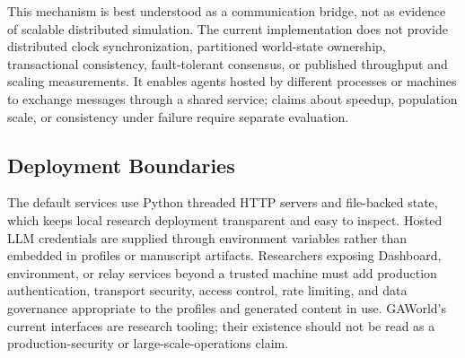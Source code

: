 This mechanism is best understood as a communication bridge, not as evidence
of scalable distributed simulation.  The current implementation does not
provide distributed clock synchronization, partitioned world-state ownership,
transactional consistency, fault-tolerant consensus, or published throughput
and scaling measurements.  It enables agents hosted by different processes or
machines to exchange messages through a shared service; claims about speedup,
population scale, or consistency under failure require separate evaluation.

\subsection{Deployment Boundaries}

The default services use Python threaded HTTP servers and file-backed state,
which keeps local research deployment transparent and easy to inspect.  Hosted
LLM credentials are supplied through environment variables rather than embedded
in profiles or manuscript artifacts.  Researchers exposing Dashboard,
environment, or relay services beyond a trusted machine must add production
authentication, transport security, access control, rate limiting, and data
governance appropriate to the profiles and generated content in use.  GAWorld's
current interfaces are research tooling; their existence should not be read as
a production-security or large-scale-operations claim.
